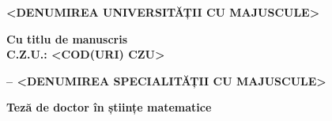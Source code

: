 \documentclass[a4paper, 12pt]{report}
\renewcommand{\baselinestretch}{1.5}
\begin{document}
\renewcommand{\thedfn}{\arabic{section}.\arabic{dfn}}
\renewcommand{\theteo}{\arabic{section}.\arabic{teo}}
\renewcommand{\thermk}{\arabic{section}.\arabic{rmk}}
\renewcommand{\thecor}{\arabic{section}.\arabic{cor}}
\renewcommand{\thelem}{\arabic{section}.\arabic{lem}}
\renewcommand{\theprop}{\arabic{section}.\arabic{pr}}
\renewcommand{\theex}{\arabic{section}.\arabic{ex}}
\renewcommand{\thepty}{\arabic{section}.\arabic{pty}}

\renewcommand{\thesection}{\arabic{section}.}

\renewcommand{\thesubsection}{\arabic{section}.\arabic{subsection}.}
\renewcommand{\contentsname}{Cuprins}%
\renewcommand{\baselinestretch}{1.5}
\renewcommand{\proofname}{\bf Demonstra\c tie}
	\renewcommand{\qedsymbol}{}

\thispagestyle{empty}
\begin{center}
{\bf \large
<DENUMIREA UNIVERSITĂȚII CU MAJUSCULE> \\}
\end{center}

\vspace*{10mm}

\begin{flushright}
{\bf\large Cu titlu de manuscris\\
C.Z.U.: <COD(URI) CZU>}
\end{flushright}

\vspace*{1cm}

\begin{center}
{\bf{}}
\end{center}

\vspace*{0.5cm}

\begin{center}
{\bf{} }
\end{center}

\vspace*{0.5cm}

\begin{center}
{\bf <CODUL SPECIALITĂȚII> -- <DENUMIREA SPECIALITĂȚII CU MAJUSCULE>}
\end{center}

\vspace*{1cm}

\begin{center}
{\bf\large Teză de doctor în științe matematice}
\end{center}
\end{document}
